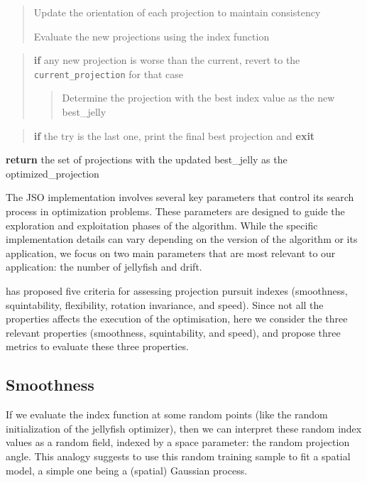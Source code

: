\documentclass[
  number,
  preprint,
  3p]{elsarticle}
\begin{document}
\begin{tcolorbox}
\begin{quote}
Update the orientation of each projection to maintain consistency

Evaluate the new projections using the index function
\end{quote}

\begin{quote}
\textbf{if} any new projection is worse than the current, revert to the
\texttt{current\_projection} for that case

\begin{quote}
Determine the projection with the best index value as the new
best\_jelly
\end{quote}
\end{quote}

\begin{quote}
\textbf{if} the try is the last one, print the final best projection and
\textbf{exit}
\end{quote}

\textbf{return} the set of projections with the updated best\_jelly as
the optimized\_projection

\end{tcolorbox}

The JSO implementation involves several key parameters that control its
search process in optimization problems. These parameters are designed
to guide the exploration and exploitation phases of the algorithm. While
the specific implementation details can vary depending on the version of
the algorithm or its application, we focus on two main parameters that
are most relevant to our application: the number of jellyfish and drift.

\citet{laa_using_2020} has proposed five criteria for assessing
projection pursuit indexes (smoothness, squintability, flexibility,
rotation invariance, and speed). Since not all the properties affects
the execution of the optimisation, here we consider the three relevant
properties (smoothness, squintability, and speed), and propose three
metrics to evaluate these three properties.

\hypertarget{sec-smoothness}{%
\subsection{Smoothness}\label{sec-smoothness}}

If we evaluate the index function at some random points (like the random
initialization of the jellyfish optimizer), then we can interpret these
random index values as a random field, indexed by a space parameter: the
random projection angle. This analogy suggests to use this random
training sample to fit a spatial model, a simple one being a (spatial)
Gaussian process.
\end{document}
